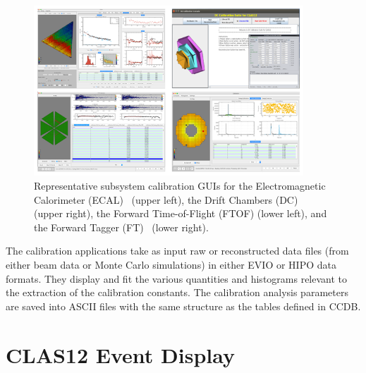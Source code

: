 \begin{figure}
\centering
\includegraphics[width=0.9\textwidth]{pics/suites.png}
\caption{Representative subsystem calibration GUIs for the Electromagnetic Calorimeter (ECAL)~\cite{ecal-nim}
  (upper left), the Drift Chambers (DC)~\cite{dc-nim} (upper right), the Forward Time-of-Flight (FTOF)
  \cite{ftof-nim} (lower left),  and the Forward Tagger (FT)~\cite{ft-nim} (lower right).}
\label{suites}
\end{figure}

The calibration applications take as input raw or reconstructed data files (from either beam data or Monte Carlo
simulations) in either EVIO or HIPO data formats.  They display and fit the various quantities and histograms
relevant to the extraction of the calibration constants.  The calibration analysis parameters are saved into ASCII
files with the same structure as the tables defined in CCDB.

\section{CLAS12 Event Display}
\label{sec:ced}

